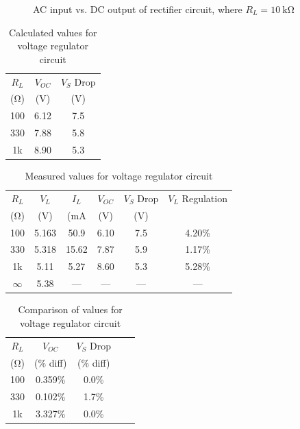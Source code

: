 \documentclass{article}
\begin{document}
\begin{figure}[hbtp]
  \centering
  
  \caption{\label{fig:rect_vp_vdc} AC input vs. DC output of rectifier circuit, where $R_L=\SI{10}{\kilo\ohm}$}
\end{figure}

\begin{table}
  \centering
  \begin{tabular}{ccc}
    $R_L$ & $V_{OC}$ & $V_S$ Drop \\
    (\si{\ohm})  & (\si{V}) & (\si{V}) \\
    \hline
    100 & 6.12 & 7.5 \\
    330 & 7.88 & 5.8 \\
    1k & 8.90 & 5.3 \\
  \end{tabular}
  \caption{\label{tab:volt_reg_calc} Calculated values for voltage regulator circuit}
\end{table}

\begin{table}
  \centering
  \begin{tabular}{cccccc}
    $R_L$ & $V_L$ & $I_L$ & $V_{OC}$ & $V_S$ Drop & $V_L$ Regulation \\
    (\si{\ohm}) & (\si{V}) & (\si{mA} & (\si{V}) & (\si{V}) & \\
    \hline
    100 & 5.163 & 50.9 & 6.10 & 7.5 & 4.20\%  \\
    330 & 5.318 & 15.62 & 7.87 & 5.9 & 1.17\% \\
    1k & 5.11 & 5.27 & 8.60 & 5.3 & 5.28\% \\
    $\infty$ & 5.38 & --- & --- & --- & ---\\
  \end{tabular}
  \caption{\label{tab:volt_reg_meas} Measured values for voltage regulator circuit}
\end{table}

\begin{table}
  \centering
  \begin{tabular}{ccccc}
    $R_L$ & $V_{OC}$ & $V_S$ Drop \\
    (\si{\ohm}) & (\% diff) & (\% diff) \\
    \hline
    100 & 0.359\% & 0.0\% \\
    330 & 0.102\% & 1.7\% \\
    1k & 3.327\% & 0.0\% \\
  \end{tabular}
  \caption{\label{tab:volt_reg_diff} Comparison of values for voltage regulator circuit}
\end{table}
\end{document}
